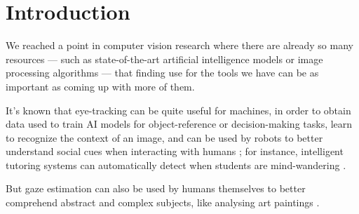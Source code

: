 \chapter{Introduction}

We reached a point in computer vision research where there are already so many resources --- such as state-of-the-art artificial intelligence models or image processing algorithms --- that finding use for the tools we have can be as important as coming up with more of them.

It's known that eye-tracking can be quite useful for machines, in order to obtain data used to train AI models for object-reference or decision-making tasks, learn to recognize the context of an image, and can be used by robots to better understand social cues when interacting with humans \cite{ijcai2020-689}; for instance, intelligent tutoring systems can automatically detect when students are mind-wandering \cite{Hutt2016TheEH}.

But gaze estimation can also be used by humans themselves to better comprehend abstract and complex subjects, like analysing art paintings \cite{Massaro2012-jx}. 

